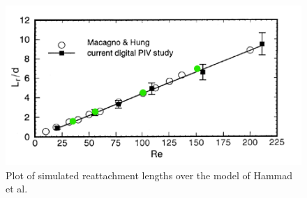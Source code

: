 \begin{figure}[H]
    \centering
    \includegraphics[width=14cm]{images/task1/reattach_plot.png}
    \caption{Plot of simulated reattachment lengths over the model of Hammad et al.}
    \label{fig:reattach_plot}
\end{figure}



